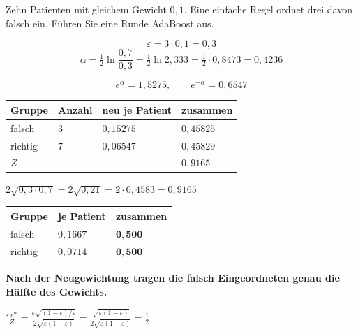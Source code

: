 \begin{aufgabe}
Zehn Patienten mit gleichem Gewicht $0{,}1$. Eine einfache Regel ordnet drei davon falsch ein. Führen Sie eine Runde AdaBoost aus.

\loesung
{}
\[ \varepsilon = 3\cdot0{,}1 = 0{,}3 \]
\[ \alpha = \tfrac12\ln\frac{0{,}7}{0{,}3} = \tfrac12\ln2{,}333 = \tfrac12\cdot0{,}8473 = 0{,}4236 \]

\[ e^{\alpha} = 1{,}5275, \qquad e^{-\alpha} = 0{,}6547 \]
\begin{center}
{\small
\renewcommand{\arraystretch}{1.48}
\begin{tabular}{@{}P{2.2cm}P{1.4cm}P{2.4cm}P{2.0cm}@{}}
\toprule
\textbf{Gruppe} & \textbf{Anzahl} & \textbf{neu je Patient} & \textbf{zusammen}\\
\midrule
falsch & $3$ & $0{,}15275$ & $0{,}45825$\\
richtig & $7$ & $0{,}06547$ & $0{,}45829$\\
\midrule
$Z$ & & & $0{,}9165$\\
\bottomrule
\end{tabular}}
\end{center}

 $2\sqrt{0{,}3\cdot0{,}7} = 2\sqrt{0{,}21} = 2\cdot0{,}4583 = 0{,}9165$ \checkmark

\begin{center}
{\small
\renewcommand{\arraystretch}{1.48}
\begin{tabular}{@{}P{2.2cm}P{2.4cm}P{2.4cm}@{}}
\toprule
\textbf{Gruppe} & \textbf{je Patient} & \textbf{zusammen}\\
\midrule
falsch & $0{,}1667$ & $\mathbf{0{,}500}$\\
richtig & $0{,}0714$ & $\mathbf{0{,}500}$\\
\bottomrule
\end{tabular}}
\end{center}

\begin{center}
\begin{minipage}{0.9\textwidth}
\textbf{Nach der Neugewichtung tragen die falsch Eingeordneten genau die Hälfte des Gewichts.}
\end{minipage}
\end{center}

 $\frac{\varepsilon\,e^{\alpha}}{Z} = \frac{\varepsilon\sqrt{(1-\varepsilon)/\varepsilon}}{2\sqrt{\varepsilon(1-\varepsilon)}} = \frac{\sqrt{\varepsilon(1-\varepsilon)}}{2\sqrt{\varepsilon(1-\varepsilon)}} = \frac12$


\end{aufgabe}

